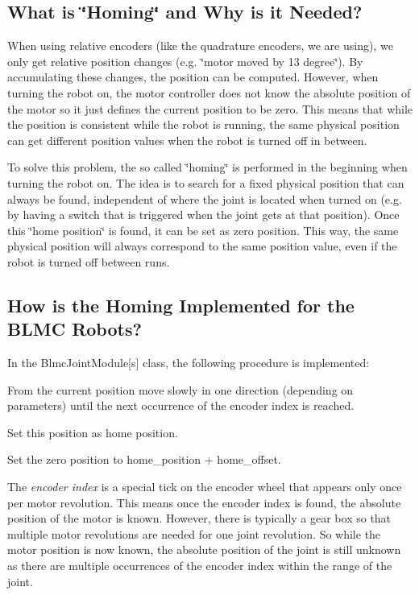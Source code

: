 \subsection*{What is \char`\"{}\+Homing\char`\"{} and Why is it Needed?}

When using relative encoders (like the quadrature encoders, we are using), we only get relative position changes (e.\+g. \char`\"{}motor moved by 13 degree\char`\"{}). By accumulating these changes, the position can be computed. However, when turning the robot on, the motor controller does not know the absolute position of the motor so it just defines the current position to be zero. This means that while the position is consistent while the robot is running, the same physical position can get different position values when the robot is turned off in between.

To solve this problem, the so called \char`\"{}homing\char`\"{} is performed in the beginning when turning the robot on. The idea is to search for a fixed physical position that can always be found, independent of where the joint is located when turned on (e.\+g. by having a switch that is triggered when the joint gets at that position). Once this \char`\"{}home position\char`\"{} is found, it can be set as zero position. This way, the same physical position will always correspond to the same position value, even if the robot is turned off between runs.

\subsection*{How is the Homing Implemented for the B\+L\+MC Robots?}

In the {\ttfamily Blmc\+Joint\+Module\mbox{[}s\mbox{]}} class, the following procedure is implemented\+:


\begin{DoxyEnumerate}
\item From the current position move slowly in one direction (depending on parameters) until the next occurrence of the encoder index is reached.
\item Set this position as home position.
\item Set the zero position to home\+\_\+position + home\+\_\+offset.
\end{DoxyEnumerate}

The {\itshape encoder index} is a special tick on the encoder wheel that appears only once per motor revolution. This means once the encoder index is found, the absolute position of the motor is known. However, there is typically a gear box so that multiple motor revolutions are needed for one joint revolution. So while the motor position is now known, the absolute position of the joint is still unknown as there are multiple occurrences of the encoder index within the range of the joint.

